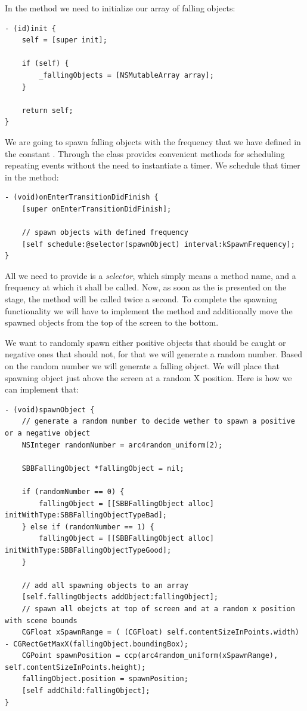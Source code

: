 In the  method we need to initialize our array of falling
objects:

\begin{lstlisting}
- (id)init {
    self = [super init];
    
    if (self) {
        _fallingObjects = [NSMutableArray array];
    }
    
    return self;
}
\end{lstlisting}

We are going to spawn falling objects with the frequency that we have defined in
the constant . Through the  class
\cocos{} provides convenient methods for scheduling repeating events without the
need to instantiate a timer. We schedule that timer in the
 method:

\begin{lstlisting}
- (void)onEnterTransitionDidFinish {
    [super onEnterTransitionDidFinish];
    
    // spawn objects with defined frequency
    [self schedule:@selector(spawnObject) interval:kSpawnFrequency];
}
\end{lstlisting}

All we need to provide is a \textit{selector}, which simply means a method
name, and a frequency at which it shall be called. Now, as soon as the
 is presented on the stage, the
 method will be called twice a second.
To complete the spawning functionality we will have to implement the
 method and additionally move the spawned objects from
the top of the screen to the bottom.

We want to randomly spawn either positive objects that should be caught or
negative ones that should not, for that we will generate a random number. Based
on the random number we will generate a falling object. We will place that
spawning object just above the screen at a random X position. Here is how we can
implement that:

\begin{lstlisting}
- (void)spawnObject {
    // generate a random number to decide wether to spawn a positive or a negative object
    NSInteger randomNumber = arc4random_uniform(2);

    SBBFallingObject *fallingObject = nil;
    
    if (randomNumber == 0) {
        fallingObject = [[SBBFallingObject alloc] initWithType:SBBFallingObjectTypeBad];
    } else if (randomNumber == 1) {
        fallingObject = [[SBBFallingObject alloc] initWithType:SBBFallingObjectTypeGood];
    }
    
    // add all spawning objects to an array
    [self.fallingObjects addObject:fallingObject];
    // spawn all obejcts at top of screen and at a random x position with scene bounds
    CGFloat xSpawnRange = ( (CGFloat) self.contentSizeInPoints.width) - CGRectGetMaxX(fallingObject.boundingBox);
    CGPoint spawnPosition = ccp(arc4random_uniform(xSpawnRange), self.contentSizeInPoints.height);
    fallingObject.position = spawnPosition;
    [self addChild:fallingObject];
}
\end{lstlisting}

